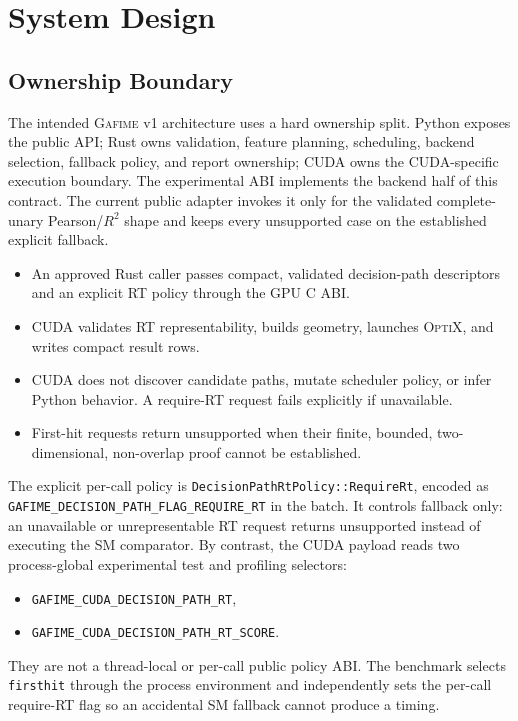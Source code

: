 \documentclass[11pt]{article}
\newcommand{\gafime}{\textsc{Gafime}\xspace}
\newcommand{\cuda}{\textsc{CUDA}\xspace}
\newcommand{\optix}{\textsc{OptiX}\xspace}
\begin{document}
\section{System Design}

\subsection{Ownership Boundary}

The intended \gafime v1 architecture uses a hard ownership split. Python
exposes the public API; Rust owns validation, feature planning, scheduling,
backend selection, fallback policy, and report ownership; \cuda owns the
CUDA-specific execution boundary. The experimental ABI implements the backend
half of this contract. The current public adapter invokes it only for the
validated complete-unary Pearson/$R^2$ shape and keeps every unsupported case on
the established explicit fallback.

\begin{itemize}
  \item An approved Rust caller passes compact, validated decision-path
  descriptors and an explicit RT policy through the GPU C ABI.
  \item \cuda validates RT representability, builds geometry, launches \optix,
  and writes compact result rows.
  \item \cuda does not discover candidate paths, mutate scheduler policy, or
  infer Python behavior. A require-RT request fails explicitly if unavailable.
  \item First-hit requests return unsupported when their finite, bounded,
  two-dimensional, non-overlap proof cannot be established.
\end{itemize}

The explicit per-call policy is
\nolinkurl{DecisionPathRtPolicy::RequireRt}, encoded as
\nolinkurl{GAFIME_DECISION_PATH_FLAG_REQUIRE_RT} in the batch. It controls
fallback only: an unavailable or unrepresentable RT request returns unsupported
instead of executing the SM comparator. By contrast, the CUDA payload reads
two process-global experimental test and profiling selectors:
\begin{itemize}
  \item \nolinkurl{GAFIME_CUDA_DECISION_PATH_RT},
  \item \nolinkurl{GAFIME_CUDA_DECISION_PATH_RT_SCORE}.
\end{itemize}
They are not a thread-local or per-call public policy ABI. The benchmark selects
\texttt{firsthit} through the process environment and independently sets the
per-call require-RT flag so an accidental SM fallback cannot produce a timing.
\end{document}
